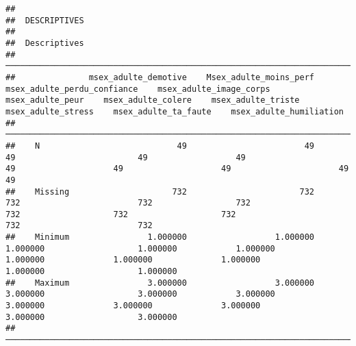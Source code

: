 \documentclass[
]{article}
\begin{document}
\begin{verbatim}
## 
##  DESCRIPTIVES
## 
##  Descriptives                                                                                                                                                                                                                                                     
##  ──────────────────────────────────────────────────────────────────────────────────────────────────────────────────────────────────────────────────────────────────────────────────────────────────────────────────────────────────────────────────────────────── 
##               msex_adulte_demotive    Msex_adulte_moins_perf    msex_adulte_perdu_confiance    msex_adulte_image_corps    msex_adulte_peur    msex_adulte_colere    msex_adulte_triste    msex_adulte_stress    msex_adulte_ta_faute    msex_adulte_humiliation   
##  ──────────────────────────────────────────────────────────────────────────────────────────────────────────────────────────────────────────────────────────────────────────────────────────────────────────────────────────────────────────────────────────────── 
##    N                            49                        49                             49                         49                  49                    49                    49                    49                      49                         49   
##    Missing                     732                       732                            732                        732                 732                   732                   732                   732                     732                        732   
##    Minimum                1.000000                  1.000000                       1.000000                   1.000000            1.000000              1.000000              1.000000              1.000000                1.000000                   1.000000   
##    Maximum                3.000000                  3.000000                       3.000000                   3.000000            3.000000              3.000000              3.000000              3.000000                3.000000                   3.000000   
##  ────────────────────────────────────────────────────────────────────────────────────────────────────────────────────────────────────────────────────────────────────────────────────────────────────────────────────────────────────────────────────────────────
\end{verbatim}
\end{document}
